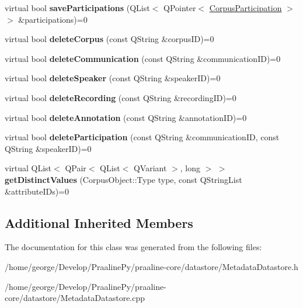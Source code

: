 \begin{DoxyCompactItemize}
virtual bool {\bfseries save\+Participations} (Q\+List$<$ Q\+Pointer$<$ \hyperlink{class_corpus_participation}{Corpus\+Participation} $>$ $>$ \&participations)=0
\item 
\mbox{\label{class_metadata_datastore_a1e5c02513322233642de8a60f694fdef}} 
virtual bool {\bfseries delete\+Corpus} (const Q\+String \&corpus\+ID)=0
\item 
\mbox{\label{class_metadata_datastore_a304d39c075b23513559ee380fb730284}} 
virtual bool {\bfseries delete\+Communication} (const Q\+String \&communication\+ID)=0
\item 
\mbox{\label{class_metadata_datastore_ac2318a02556d219a8ad59408aff38a5e}} 
virtual bool {\bfseries delete\+Speaker} (const Q\+String \&speaker\+ID)=0
\item 
\mbox{\label{class_metadata_datastore_abb55f279e80a76cc23569227776f232c}} 
virtual bool {\bfseries delete\+Recording} (const Q\+String \&recording\+ID)=0
\item 
\mbox{\label{class_metadata_datastore_a1e1bf7ac09a4c132cfcbd2df9c0fa80b}} 
virtual bool {\bfseries delete\+Annotation} (const Q\+String \&annotation\+ID)=0
\item 
\mbox{\label{class_metadata_datastore_a0b7b8b053e39c6ab8d5a202124c057d2}} 
virtual bool {\bfseries delete\+Participation} (const Q\+String \&communication\+ID, const Q\+String \&speaker\+ID)=0
\item 
\mbox{\label{class_metadata_datastore_a021c0eb4620a3bfa05fcbd832583531c}} 
virtual Q\+List$<$ Q\+Pair$<$ Q\+List$<$ Q\+Variant $>$, long $>$ $>$ {\bfseries get\+Distinct\+Values} (Corpus\+Object\+::\+Type type, const Q\+String\+List \&attribute\+I\+Ds)=0
\end{DoxyCompactItemize}
\subsection*{Additional Inherited Members}


The documentation for this class was generated from the following files\+:\begin{DoxyCompactItemize}
\item 
/home/george/\+Develop/\+Praaline\+Py/praaline-\/core/datastore/Metadata\+Datastore.\+h\item 
/home/george/\+Develop/\+Praaline\+Py/praaline-\/core/datastore/Metadata\+Datastore.\+cpp\end{DoxyCompactItemize}
